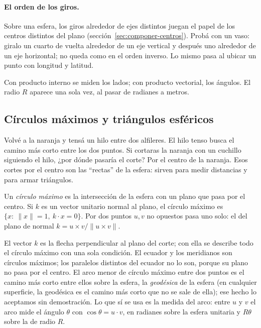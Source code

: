 \paragraph{El orden de los giros.} Sobre una esfera, los giros alrededor de ejes distintos
juegan el papel de los centros distintos del plano (sección~\ref{sec:componer-centros}). Probá
con un vaso: giralo un cuarto de vuelta alrededor de un eje vertical y después uno alrededor
de un eje horizontal; no queda como en el orden inverso. Lo mismo pasa al ubicar un punto con
longitud y latitud.

\begin{idea}
Con producto interno se miden los lados; con producto vectorial, los ángulos. El radio \(R\)
aparece una sola vez, al pasar de radianes a metros.
\end{idea}

\subsection{Círculos máximos y triángulos esféricos}

Volvé a la naranja y tensá un hilo entre dos alfileres. El hilo tenso busca el camino más
corto entre los dos puntos. Si cortaras la naranja con un cuchillo siguiendo el hilo, ¿por
dónde pasaría el corte? Por el centro de la naranja. Esos cortes por el centro son las
\enquote{rectas} de la esfera: sirven para medir distancias y para armar triángulos.

\begin{definicion}
Un \emph{círculo máximo} es la intersección de la esfera con un plano que pasa por el
centro. Si \(k\) es un vector unitario normal al plano, el círculo máximo es
\(\{x:\ \|x\|=1,\ k\cdot x=0\}\). Por dos puntos \(u,v\) no opuestos pasa uno solo: el del
plano de normal \(k=u\times v/\|u\times v\|\).
\end{definicion}

El vector \(k\) es la flecha perpendicular al plano del corte; con ella se describe todo el
círculo máximo con una sola condición. El ecuador y los meridianos son círculos máximos; los
paralelos distintos del ecuador no lo son, porque su plano no pasa por el centro. El arco
menor de círculo máximo entre dos puntos es el camino más corto entre ellos sobre la esfera, la
\emph{geodésica} de la esfera (en cualquier superficie, la geodésica es el camino más corto
que no se sale de ella); ese hecho lo aceptamos sin demostración. Lo que sí se usa es la
medida del arco: entre \(u\) y \(v\) el arco mide el ángulo \(\theta\) con \(\cos\theta=u\cdot v\),
en radianes sobre la esfera unitaria y \(R\theta\) sobre la de radio \(R\).

